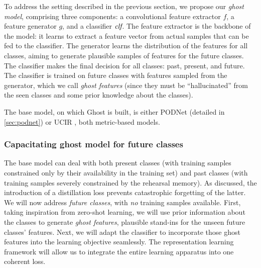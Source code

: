 To address the setting described in the previous section, we propose our \textit{ghost model},
comprising three components: a convolutional feature extractor $f$, a feature generator $g$, and a
classifier $\textit{clf}$. The feature extractor is the backbone of the model: it learns to extract a
feature vector from actual samples that can be fed to the classifier. The generator learns the
distribution of the features for all classes, aiming to generate plausible samples of features for
the future classes. The classifier makes the final decision for all classes: past, present, and
future. The classifier is trained on future classes with features sampled from the generator, which
we call \textit{ghost features} (since they must be “hallucinated” from the seen classes and some
prior knowledge about the classes).

The base model, on which Ghost is built, is either PODNet (detailed in \autoref{sec:podnet}) or UCIR
\citep{hou2019ucir}, both metric-based models.

\subsubsection{Capacitating ghost model for future classes}
\label{sec:ghost_zeroshot}

The base model can deal with both present classes (with training samples constrained only by their
availability in the training set)  and past classes (with training samples severely constrained by
the rehearsal memory). As discussed, the introduction of a distillation loss prevents catastrophic
forgetting of the latter. We will now address \textit{future classes}, with \textit{no} training
samples available. First, taking inspiration from zero-shot learning, we will use prior information
about the classes to generate \textit{ghost features}, plausible stand-ins for the unseen future
classes' features. Next, we will adapt the classifier to incorporate those ghost features into the
learning objective seamlessly. The representation learning framework will allow us to integrate the
entire learning apparatus into one coherent loss.

